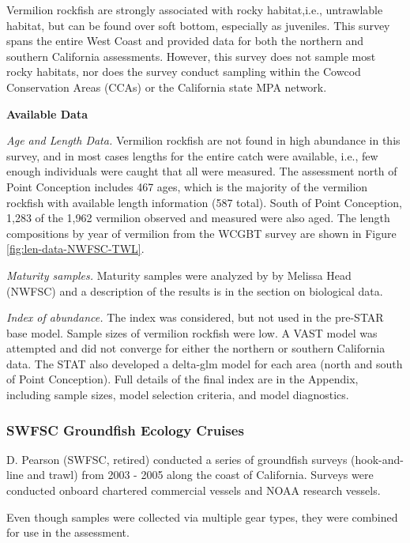 \documentclass[
  english,
  a4paper,
]{article}
\begin{document}
Vermilion rockfish are strongly associated with rocky
habitat,i.e., untrawlable habitat, but can be found over soft bottom, especially as
juveniles. This survey spans the entire West Coast and provided data for both the northern
and southern California assessments. However, this survey does not sample most rocky habitats, nor does the survey conduct sampling within the Cowcod Conservation Areas (CCAs) or the California state MPA network.

\textbf{Available Data}

\emph{Age and Length Data.} Vermilion rockfish are not found in high abundance in this survey, and in most
cases lengths for the entire catch were available, i.e., few enough individuals were caught that
all were measured. The assessment north of Point Conception includes 467 ages, which
is the majority of the vermilion rockfish with available length information (587 total).
South of Point Conception, 1,283 of the 1,962 vermilion observed and measured were also aged.
The length compositions by year of vermilion from the WCGBT survey are shown in Figure \ref{fig:len-data-NWFSC-TWL}.

\emph{Maturity samples.} Maturity samples were analyzed by by Melissa Head (NWFSC) and a
description of the results is in the section on biological data.

\emph{Index of abundance.} The index was considered, but not used in the pre-STAR base model. Sample
sizes of vermilion rockfish were low. A VAST model was attempted and did not converge
for either the northern or southern California data. The STAT also developed
a delta-glm model for each area (north and south of Point Conception). Full details
of the final index are in the Appendix, including
sample sizes, model selection criteria, and model diagnostics.

\hypertarget{swfsc-groundfish-ecology-cruises}{%
\subsubsection{SWFSC Groundfish Ecology Cruises}\label{swfsc-groundfish-ecology-cruises}}

D. Pearson (SWFSC, retired) conducted a series of groundfish surveys (hook-and-line and
trawl) from 2003 - 2005 along the coast of California. Surveys were conducted onboard
chartered commercial vessels and NOAA research vessels.

Even though samples were collected via multiple gear types, they were combined for use
in the assessment.
\end{document}
